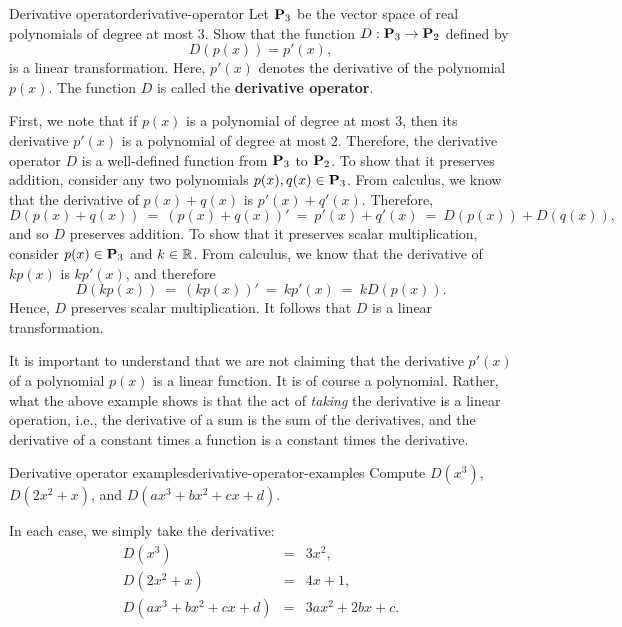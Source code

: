 \begin{example}{Derivative operator}{derivative-operator}
  Let $\mathbf{P}_3$ be the vector space of real polynomials of degree at
  most $3$. Show that the function $D:\mathbf{P}_3\to\mathbf{P}_2$ defined by
  \begin{equation*}
    D(p(x)) = p'(x),
  \end{equation*}
  is a linear transformation. Here, $p'(x)$ denotes the derivative of
  the polynomial $p(x)$. The function $D$ is called the
  \textbf{derivative operator}.
\end{example}

\begin{solution}
  First, we note that if $p(x)$ is a polynomial of degree at most $3$,
  then its derivative $p'(x)$ is a polynomial of degree at most
  $2$. Therefore, the derivative operator $D$ is a well-defined
  function from $\mathbf{P}_3$ to $\mathbf{P}_2$. To show that it preserves
  addition, consider any two polynomials $p(x),q(x)\in\mathbf{P}_3$. From
  calculus, we know that the derivative of $p(x)+q(x)$ is
  $p'(x)+q'(x)$. Therefore,
  \begin{equation*}
    D(p(x)+q(x)) ~=~ (p(x)+q(x))' ~=~ p'(x)+q'(x) ~=~ D(p(x)) + D(q(x)),
  \end{equation*}
  and so $D$ preserves addition. To show that it preserves scalar
  multiplication, consider $p(x)\in\mathbf{P}_3$ and $k\in\mathbb{R}$. From
  calculus, we know that the derivative of $kp(x)$ is $kp'(x)$, and
  therefore
  \begin{equation*}
    D(kp(x)) ~=~ (kp(x))' ~=~ kp'(x) ~=~ kD(p(x)).
  \end{equation*}
  Hence, $D$ preserves scalar multiplication. It follows that $D$ is a
  linear transformation.
\end{solution}

It is important to understand that we are not claiming that the
derivative $p'(x)$ of a polynomial $p(x)$ is a linear function. It is
of course a polynomial. Rather, what the above example shows is that
the act of {\em taking} the derivative is a linear operation, i.e.,
the derivative of a sum is the sum of the derivatives, and the
derivative of a constant times a function is a constant times the
derivative.

\begin{example}{Derivative operator examples}{derivative-operator-examples}
  Compute $D(x^3)$, $D(2x^2+x)$, and $D(ax^3+bx^2+cx+d)$.
\end{example}

\begin{solution}
  In each case, we simply take the derivative:
  \begin{eqnarray*}
    D(x^3) &=& 3x^2, \\
    D(2x^2+x) &=& 4x+1, \\
    D(ax^3+bx^2+cx+d) &=& 3ax^2 + 2bx + c.
  \end{eqnarray*}
\end{solution}

